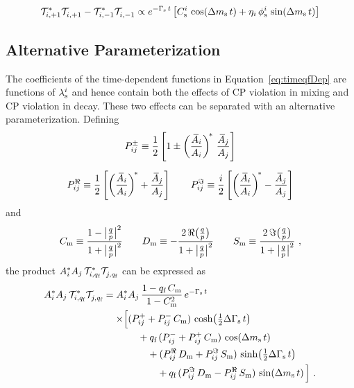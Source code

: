 \begin{equation}
  \label{eq:timeOscill}
  \timeAmp[i,+1]^*\timeAmp[i,+1]^{\phantom{*}} - \timeAmp[i,-1]^*\timeAmp[i,-1]^{\phantom{*}}
    \propto \eGst\left[ \Csi\,\cDms + \eta_i\,\phisi\,\sDms \right]
\end{equation}



\subsection{Alternative Parameterization}
\label{subsec:pheno_time_altParam}
The coefficients of the time-dependent functions in Equation~\ref{eq:timeqfDep} are functions of $\lamsi$ and hence contain both the
effects of CP violation in mixing and CP violation in decay. These two effects can be separated with an alternative parameterization.
Defining
\begin{equation}
  \label{eq:decayRho}
  \begin{gathered}
    \Ppm \equiv \frac{1}{2} \left[ 1 \pm \left(\frac{\Abari}{\Ai}\right)^{\!*}\, \frac{\Abari[j]}{\Ai[j]} \right] \\[0.6em]
    \Pre \equiv \frac{1}{2} \left[ \left(\frac{\Abari}{\Ai}\right)^{\!*} + \frac{\Abari[j]}{\Ai[j]} \right] \quad\quad
    \Pim \equiv \frac{i}{2} \left[ \left(\frac{\Abari}{\Ai}\right)^{\!*} - \frac{\Abari[j]}{\Ai[j]} \right]
  \end{gathered}
\end{equation}
and
\begin{equation}
  \label{eq:mixCDS}
  \Cm \equiv \frac{1-\qpAbsAlt^2}{1+\qpAbsAlt^2}
  \qquad \Dm \equiv -\frac{2\,\Re\big(\qpAlt\big)}{1+\qpAbsAlt^2}
  \qquad \Sm \equiv  \frac{2\,\Im\big(\qpAlt\big)}{1+\qpAbsAlt^2}
  \ ,
\end{equation}
the product $\Ai^*\Ai[j]\,\timeAmp[i,\qf]^*\timeAmp[j,\qf]^{\phantom{*}}$ can be expressed as
\begin{equation}
  \label{eq:timeqfDepSep}
  \begin{aligned}
    \Ai^*\Ai[j]\,\timeAmp[i,\qf]^*\timeAmp[j,\qf]^{\phantom{*}} =
      \Ai^*&\Ai[j]\, \frac{1-\qf\,\Cm}{1-\Cm^2}\, \eGst \\
        \times\Big[ &(\Ppl+\Pmn\,\Cm)\,\cDGs \\
                    &\quad + \qf\,(\Pmn+\Ppl\,\Cm)\,\cDms \\
                    &\quad\quad + (\Pre\,\Dm+\Pim\,\Sm)\,\sDGs \\
                    &\quad\quad\quad + \qf\,(\Pim\,\Dm-\Pre\,\Sm)\,\sDms \Big] \ .
  \end{aligned}
\end{equation}

